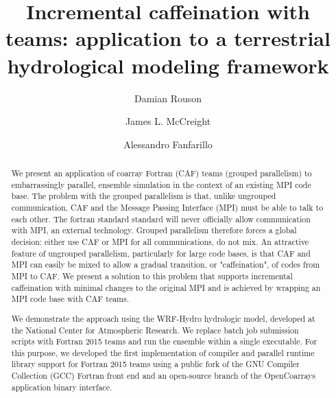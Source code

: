 \documentclass[sigconf, authordraft]{acmart}
\begin{document}
\title{Incremental caffeination with teams: application to a terrestrial hydrological modeling framework}

\author{Damian Rouson}
\renewcommand{\shortauthors}{D. Rouson et al.}

\author{James L. McCreight}

\author{Alessandro Fanfarillo}


\begin{abstract}
We present an application of coarray Fortran (CAF) teams (grouped parallelism) to embarrassingly parallel, ensemble simulation in the context of an existing MPI code base.
The problem with the grouped parallelism is that, unlike ungrouped communication, CAF and the Message Passing Interface (MPI) must be able to talk to each other. 
The fortran standard standard will never officially allow communication with MPI, an external technology. Grouped parallelism therefore forces a global decision: either use CAF or MPI for all communications, do not mix. An attractive feature of ungrouped parallelism, particularly for large code bases, is that CAF and MPI can easily be mixed to allow a gradual transition, or "caffeination", of codes from MPI to CAF. We present a solution to this problem that supports incremental caffeination with minimal changes to the original MPI and is achieved by wrapping an MPI code base with CAF teams.

We demonstrate the approach using the WRF-Hydro hydrologic model, developed at the National Center for Atmospheric Research. 
We replace batch job submission scripts with Fortran 2015 teams and run the ensemble within a single executable. For this purpose, we developed the
first implementation of compiler and parallel runtime library support for Fortran 2015
teams using a public fork of the GNU Compiler Collection (GCC) Fortran front end and
an open-source branch of the OpenCoarrays application binary interface.
\end{abstract}
\end{document}
